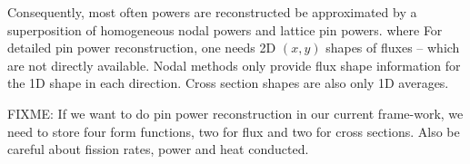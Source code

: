 \documentclass{school-22.211-notes}
\begin{document}
Consequently, most often powers are reconstructed be approximated by a superposition of homogeneous nodal powers and lattice pin powers. 
where
For detailed pin power reconstruction, one needs 2D $(x,y)$ shapes of fluxes -- which are not directly available. Nodal methods only provide flux shape information for the 1D shape in each direction. Cross section shapes are also only 1D averages. 


FIXME: If we want to do pin power reconstruction in our current frame-work, we need to store four form functions, two for flux and two for cross sections. Also be careful about fission rates, power and heat conducted. 


\clearpage
{}
\end{document}
